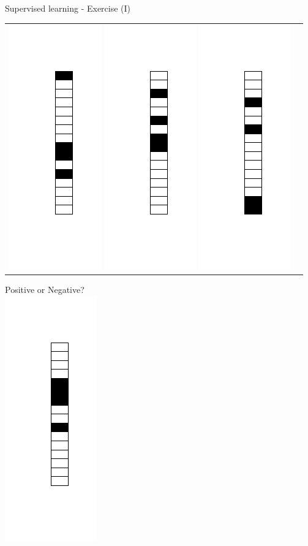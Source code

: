 \documentclass[color=usenames,dvipsnames]{beamer}
\begin{document}
\begin{frame}{Supervised learning - Exercise (I)}
\begin{table}[ht]
\begin{tabular}{c|c}
		\includegraphics[width=0.1\linewidth]{../figures/1d_random_supervised_learning_2.png}
		\includegraphics[width=0.1\linewidth]{../figures/1d_random_supervised_learning_3.png}
		\includegraphics[width=0.1\linewidth]{../figures/1d_random_supervised_learning_4.png}
		\\
	\end{tabular}
\end{table}

\begin{center}
Positive or Negative?\\
\includegraphics[width=0.1\linewidth]{../figures/1d_pattern_supervised_learning_5.png}
\end{center}

\end{frame}
\end{document}
